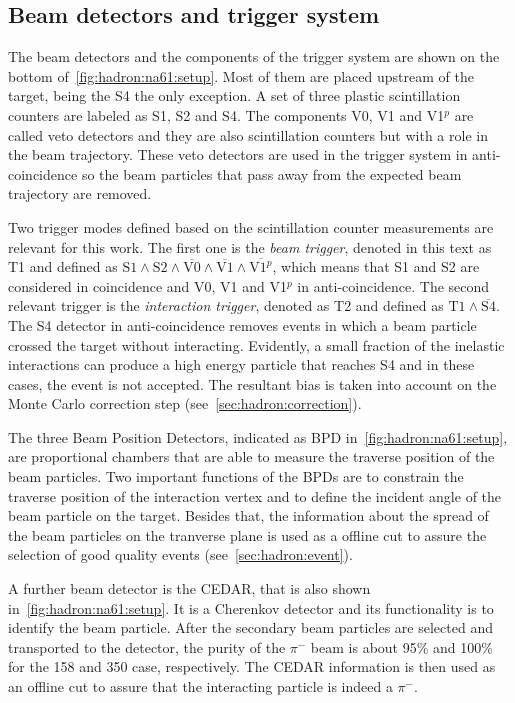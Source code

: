 \subsection{\boldmath Beam detectors and trigger system}
\label{sec:hadron:na61:trigger}

The beam detectors and the components of the trigger system are shown
on the bottom of~\cref{fig:hadron:na61:setup}. Most of them are placed upstream of
the target, being the S4 the only exception. A set of three plastic
scintillation counters are labeled as S1, S2 and S4. The components
V0, V1 and V1$^p$ are called veto detectors and they are also scintillation
counters but with a role in the beam trajectory. These veto detectors
are used in the trigger system in anti-coincidence so the beam particles
that pass away from the expected beam trajectory are removed.

Two trigger modes defined based on the scintillation counter measurements
are relevant for this work. The first one is the \emph{beam trigger},
denoted in this text as T1 and defined as 
$\text{S1}\wedge\text{S2}\wedge\overline{\text{V0}}\wedge\overline{\text{V1}}\wedge\overline{\text{V1}^p}$,
which means that S1 and S2 are considered in coincidence and V0, V1 and V1$^p$ in anti-coincidence.
The second relevant trigger is the \emph{interaction trigger}, denoted as T2
and defined as 
$\text{T1}\wedge\overline{\text{S4}}$.
The S4 detector in anti-coincidence removes events in which a beam
particle crossed the target without interacting. Evidently,
a small fraction of the inelastic interactions can produce
a high energy particle that reaches S4 and in these cases, the
event is not accepted. The resultant bias is taken into
account on the Monte Carlo correction step (see~\cref{sec:hadron:correction}).

The three Beam Position Detectors, indicated as BPD in~\cref{fig:hadron:na61:setup},
are proportional chambers that are able to measure the traverse position
of the beam particles. Two important functions of the BPDs are to constrain
the traverse position of the interaction vertex and to define the
incident angle of the beam particle on the target. Besides that,
the information about the spread of the beam particles on the
tranverse plane is used as a offline cut to assure the
selection of good quality events (see~\cref{sec:hadron:event}).

A further beam detector is the CEDAR, that is also shown
in~\cref{fig:hadron:na61:setup}. It is a Cherenkov detector
and its functionality is to identify the beam particle.
After the secondary beam particles are selected and
transported to the \NASixtyOne detector, the purity of the
$\pi^-$ beam is about 95\% and 100\% for the 158 and 350 \GeVc
case, respectively. The CEDAR information is then used as
an offline cut to assure that the interacting particle
is indeed a $\pi^-$.


